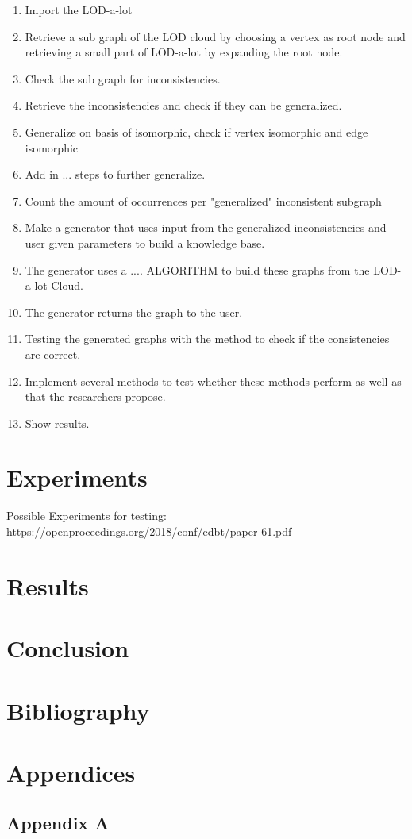 \documentclass{article}
\begin{document}
\begin{enumerate}
	\item Import the LOD-a-lot
	\item Retrieve a sub graph of the LOD cloud by choosing a vertex as root node and retrieving a small part of LOD-a-lot by expanding the root node.
	\item Check the sub graph for inconsistencies. 
	\item Retrieve the inconsistencies and check if they can be generalized.
	\item Generalize on basis of isomorphic, check if vertex isomorphic and edge isomorphic
	\item Add in ... steps to further generalize.
	\item Count the amount of occurrences per "generalized" inconsistent subgraph
	\item Make a generator that uses input from the generalized inconsistencies and user given parameters to build a knowledge base.
	\item The generator uses a .... ALGORITHM to build these graphs from the LOD-a-lot Cloud.
	\item The generator returns the graph to the user.
	\item Testing the generated graphs with the method to check if the consistencies are correct. 
	\item Implement several methods to test whether these methods perform as well as that the researchers propose.
	\item Show results.
\end{enumerate}


\newpage
\section{Experiments}
Possible Experiments for testing:
https://openproceedings.org/2018/conf/edbt/paper-61.pdf

\newpage
\section{Results}


\newpage
\section{Conclusion}


\newpage
\section{Bibliography}


\newpage
\section{Appendices}
\subsection{Appendix A}
\end{document}
